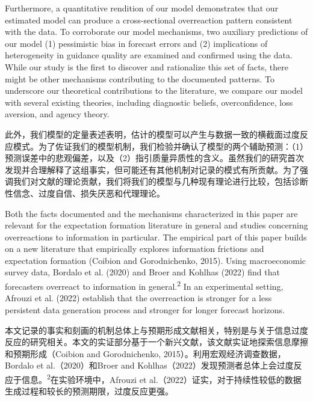 \documentclass[12pt,a4paper]{article}
\newenvironment{original}
  {\par\medskip\noindent\ignorespaces}
  {\par\medskip}
\newenvironment{translation}
  {\par\noindent{\color{transblue}\ignorespaces}}
  {\par\bigskip}
\begin{document}
\begin{original}
Furthermore, a quantitative rendition of our model demonstrates that our estimated model can produce a cross-sectional overreaction pattern consistent with the data. To corroborate our model mechanisms, two auxiliary predictions of our model (1) pessimistic bias in forecast errors and (2) implications of heterogeneity in guidance quality are examined and confirmed using the data. While our study is the first to discover and rationalize this set of facts, there might be other mechanisms contributing to the documented patterns. To underscore our theoretical contributions to the literature, we compare our model with several existing theories, including diagnostic beliefs, overconfidence, loss aversion, and agency theory.
\end{original}
\begin{translation}
此外，我们模型的定量表述表明，估计的模型可以产生与数据一致的横截面过度反应模式。为了佐证我们的模型机制，我们检验并确认了模型的两个辅助预测：（1）预测误差中的悲观偏差，以及（2）指引质量异质性的含义。虽然我们的研究首次发现并合理解释了这组事实，但可能还有其他机制对记录的模式有所贡献。为了强调我们对文献的理论贡献，我们将我们的模型与几种现有理论进行比较，包括诊断性信念、过度自信、损失厌恶和代理理论。
\end{translation}

\begin{original}
Both the facts documented and the mechanisms characterized in this paper are relevant for the expectation formation literature in general and studies concerning overreactions to information in particular. The empirical part of this paper builds on a new literature that empirically explores information frictions and expectation formation (Coibion and Gorodnichenko, 2015). Using macroeconomic survey data, Bordalo et al. (2020) and Broer and Kohlhas (2022) find that forecasters overreact to information in general.\textsuperscript{2} In an experimental setting, Afrouzi et al. (2022) establish that the overreaction is stronger for a less persistent data generation process and stronger for longer forecast horizons.
\end{original}
\begin{translation}
本文记录的事实和刻画的机制总体上与预期形成文献相关，特别是与关于信息过度反应的研究相关。本文的实证部分基于一个新兴文献，该文献实证地探索信息摩擦和预期形成（Coibion and Gorodnichenko, 2015）。利用宏观经济调查数据，Bordalo et al.（2020）和Broer and Kohlhas（2022）发现预测者总体上会过度反应于信息。\textsuperscript{2}在实验环境中，Afrouzi et al.（2022）证实，对于持续性较低的数据生成过程和较长的预测期限，过度反应更强。
\end{translation}
\end{document}
